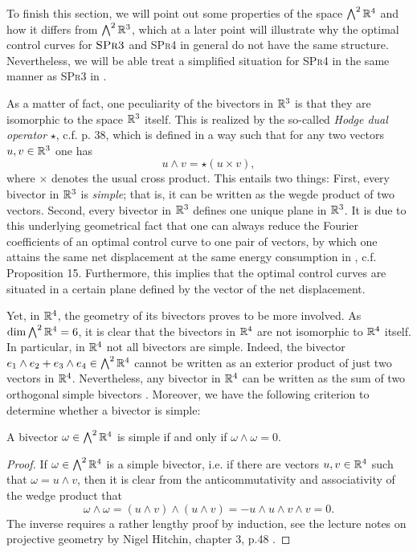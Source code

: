 To finish this section, we will point out some properties of the space $\bigwedge^2 \mathbb{R}^4$ and how it differs from $\bigwedge^2 \mathbb{R}^3$, which at a later point will illustrate why the optimal control curves for $\textsc{SPr3}$ and \textsc{SPr4} in general do not have the same structure. Nevertheless, we will be able treat a simplified situation for \textsc{SPr4} in the same manner as \textsc{SPr3} in \cite{Alouges2017}.

As a matter of fact, one peculiarity of the bivectors in $\mathbb{R}^3$ is that they are isomorphic to the space $\mathbb{R}^3$ itself. This is realized by the so-called \emph{Hodge dual operator} $\star$, c.f. \cite{Lounesto2006} p. 38, which is defined in a way such that for any two vectors $u,v \in \mathbb{R}^3$ one has
\begin{equation}
\label{eq: hodge star}
u \wedge v = \star(u \times v),
\end{equation}
where $\times$ denotes the usual cross product. This entails two things: First, every bivector in $\mathbb{R}^3$ is \emph{simple}; that is, it can be written as the wegde product of two vectors. Second, every bivector in $\mathbb{R}^3$ defines one unique plane in $\mathbb{R}^3$. It is due to this underlying geometrical fact that one can always reduce the Fourier coefficients of an optimal control curve to one pair of vectors, by which one attains the same net displacement at the same energy consumption in \cite{Alouges2017}, c.f. Proposition 15. Furthermore, this implies that the optimal control curves are situated in a certain plane defined by the vector of the net displacement.

Yet, in $\mathbb{R}^4$, the geometry of its bivectors proves to be more involved. As $\dim \bigwedge^2 \mathbb{R}^4 = 6$, it is clear that the bivectors in $\mathbb{R}^4$ are not isomorphic to $\mathbb{R}^4$ itself. In particular, in $\mathbb{R}^4$ not all bivectors are simple. Indeed, the bivector $e_1 \wedge e_2 + e_3 \wedge e_4 \in \bigwedge^2 \mathbb{R}^4$ cannot be written as an exterior product of just two vectors in $\mathbb{R}^4$. Nevertheless, any bivector in $\mathbb{R}^4$ can be written as the sum of two orthogonal simple bivectors \cite{Lounesto2006}. Moreover, we have the following criterion to determine whether a bivector is simple:


\begin{lemma}
\label{lem:simple bivector}
A bivector $\omega \in \bigwedge^2 \mathbb{R}^4$ is simple if and only if $\omega \wedge \omega = 0$.
\end{lemma}

\begin{proof}
If $\omega \in \bigwedge^2 \mathbb{R}^4$ is a simple bivector, i.e. if there are vectors $u,v \in \mathbb{R}^4$ such that $\omega = u \wedge v$, then it is clear from the anticommutativity and associativity of the wedge product that
\begin{equation}
\omega \wedge \omega = (u \wedge v) \wedge (u \wedge v) = - u \wedge u \wedge v \wedge v = 0.
\end{equation}
The inverse requires a rather lengthy proof by induction, see the lecture notes on projective geometry by Nigel Hitchin, chapter 3, p.48 \cite{Hitchin2003}.
\end{proof}

